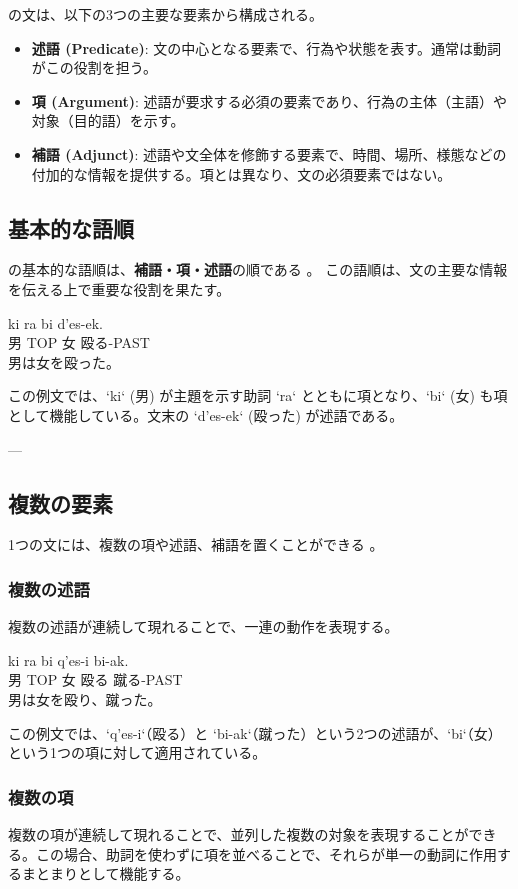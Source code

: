 \langname の文は、以下の3つの主要な要素から構成される。
\begin{itemize}
    \item \textbf{述語 (Predicate)}: 文の中心となる要素で、行為や状態を表す。通常は動詞がこの役割を担う。
    \item \textbf{項 (Argument)}: 述語が要求する必須の要素であり、行為の主体（主語）や対象（目的語）を示す。
    \item \textbf{補語 (Adjunct)}: 述語や文全体を修飾する要素で、時間、場所、様態などの付加的な情報を提供する。項とは異なり、文の必須要素ではない。
\end{itemize}

\subsection{基本的な語順}
\langname の基本的な語順は、\textbf{補語・項・述語}の順である 。
この語順は、文の主要な情報を伝える上で重要な役割を果たす。

\begin{exe}
    \ex \gll ki ra bi d'es-ek.\\
    男 TOP 女 殴る-PAST\\
    \glt 男は女を殴った。
\end{exe}
この例文では、`ki` (男) が主題を示す助詞 `ra` とともに項となり、`bi` (女) も項として機能している。文末の `d'es-ek` (殴った) が述語である。

---
\subsection{複数の要素}
1つの文には、複数の項や述語、補語を置くことができる 。

\subsubsection{複数の述語}
複数の述語が連続して現れることで、一連の動作を表現する。

\begin{exe}
    \ex \gll ki ra bi q'es-i bi-ak.\\
    男 TOP 女 殴る 蹴る-PAST\\
    \glt 男は女を殴り、蹴った。
\end{exe}
この例文では、`q'es-i`（殴る）と `bi-ak`（蹴った）という2つの述語が、`bi`（女）という1つの項に対して適用されている。

\subsubsection{複数の項}
複数の項が連続して現れることで、並列した複数の対象を表現することができる。この場合、助詞を使わずに項を並べることで、それらが単一の動詞に作用するまとまりとして機能する。

